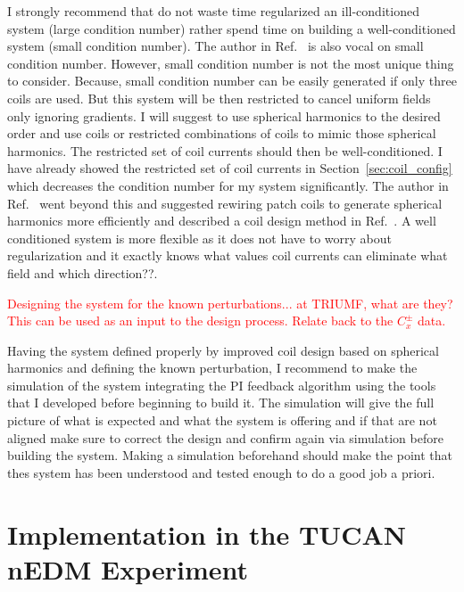 I strongly recommend that do not waste time regularized an ill-conditioned system (large condition number) rather spend time on building a well-conditioned system (small condition number). The author in Ref.~\cite{rawlik} is also vocal on small condition number. However,
small condition number is not the most unique thing to consider. Because, small condition number can be easily generated if only three coils are used. But this system will be then restricted to cancel uniform fields only ignoring gradients. I will suggest to use spherical harmonics to the desired order and use coils or restricted combinations of coils to mimic those spherical harmonics. The restricted set of coil currents should then be well-conditioned. I have already showed the restricted set of coil currents in Section~\ref{sec:coil_config} which decreases the condition number for my system significantly. The author in Ref.~\cite{rawlik} went beyond this and suggested rewiring patch coils to generate spherical harmonics more efficiently and described a coil design method in Ref.~\cite{rawlik_paper_coil}. A well conditioned system is more flexible as it does not have to worry about regularization and it exactly knows what values coil currents can eliminate what field and which direction??.

\textcolor{red}{Designing the system for the known perturbations... at TRIUMF, what are they?  This can be used as an input to the design process.  Relate back to the $C_x^\pm$ data.}

Having the system defined properly by improved coil design based on spherical harmonics and defining the known perturbation, I recommend to make the simulation of the system integrating the PI feedback algorithm using the tools that I developed before beginning to build it. The simulation will give the full picture of what is expected and what the system is offering and if that are not aligned make sure to correct the design and confirm again via simulation before building the system. Making a simulation beforehand should make the point that thes system has been understood and tested enough to do a good job a priori.







\section{Implementation in the TUCAN nEDM Experiment}

